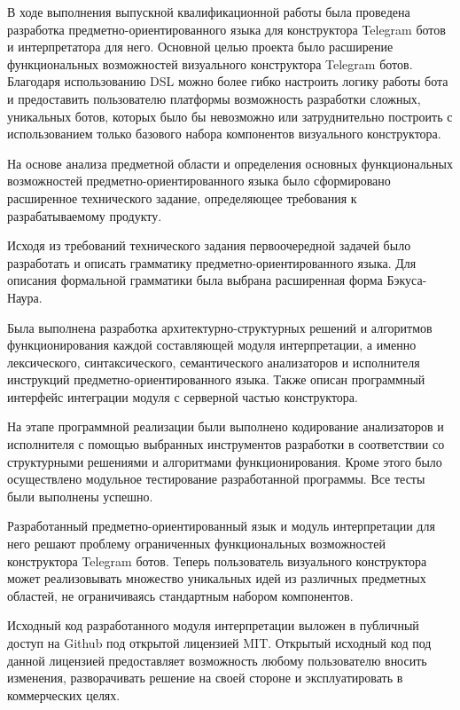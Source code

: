 \newpage


В ходе выполнения выпускной квалификационной работы была проведена разработка предметно-ориентированного языка для конструктора Telegram ботов и интерпретатора для него.
Основной целью проекта было расширение функциональных возможностей визуального конструктора Telegram ботов.
Благодаря использованию DSL можно более гибко настроить логику работы бота и предоставить пользователю платформы возможность разработки сложных, уникальных ботов,
которых было бы невозможно или затруднительно построить с использованием только базового набора компонентов визуального конструктора.

На основе анализа предметной области и определения основных функциональных возможностей предметно-ориентированного языка было сформировано расширенное технического задание,
определяющее требования к разрабатываемому продукту.

Исходя из требований технического задания первоочередной задачей было разработать и описать грамматику предметно-ориентированного языка.
Для описания формальной грамматики была выбрана расширенная форма Бэкуса-Наура.

Была выполнена разработка архитектурно-структурных решений и алгоритмов функционирования каждой составляющей модуля интерпретации,
а именно лексического, синтаксического, семантического анализаторов и исполнителя инструкций предметно-ориентированного языка.
Также описан программный интерфейс интеграции модуля с серверной частью конструктора.

На этапе программной реализации были выполнено кодирование анализаторов и исполнителя с помощью выбранных инструментов разработки
в соответствии со структурными решениями и алгоритмами функционирования.
Кроме этого было осуществлено модульное тестирование разработанной программы.
Все тесты были выполнены успешно.

Разработанный предметно-ориентированный язык и модуль интерпретации для него решают проблему ограниченных функциональных возможностей конструктора Telegram ботов.
Теперь пользователь визуального конструктора может реализовывать множество уникальных идей из различных предметных областей,
не ограничиваясь стандартным набором компонентов.

Исходный код разработанного модуля интерпретации выложен в публичный доступ на Github под открытой лицензией MIT.
Открытый исходный код под данной лицензией предоставляет возможность любому пользователю вносить изменения, разворачивать решение на своей стороне и эксплуатировать в коммерческих целях.
